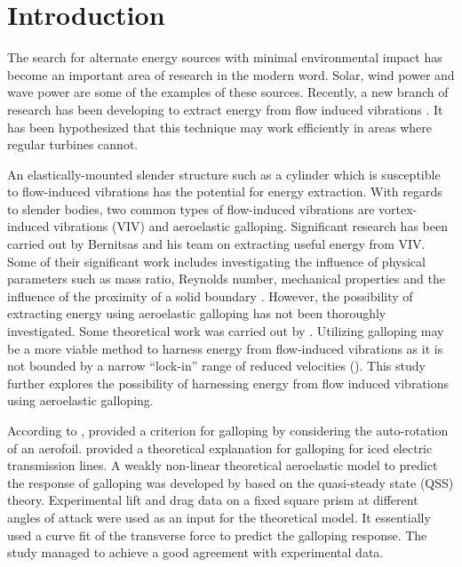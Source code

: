\section{Introduction} 

The search for alternate energy sources with minimal environmental impact has become an important area of research in the modern word. Solar, wind power and wave power are some of the examples of these sources.  Recently, a new branch of research has been developing to extract energy from flow induced vibrations \citep{Bernitsas2008a-concept}. It has been hypothesized that this technique may work efficiently in areas where regular turbines cannot. 

An elastically-mounted slender structure such as a cylinder which is susceptible to flow-induced vibrations has the potential for energy extraction. With regards to slender bodies, two common types of flow-induced vibrations are vortex-induced vibrations (VIV) and aeroelastic galloping. Significant research has been carried out by Bernitsas and his team on extracting useful energy from VIV. Some of their significant work includes investigating the influence  of physical parameters such as mass ratio, Reynolds number, mechanical properties \citep{Raghavan2010a, Lee2011b} and the influence of the proximity of a solid boundary \citep{Raghavan2009}. However, the possibility of extracting energy using aeroelastic galloping has not been thoroughly investigated. Some theoretical work was carried out by \citet{Barrero-Gil2010a}. Utilizing galloping may be a more viable method to harness energy from flow-induced vibrations as it is not bounded by a narrow ``lock-in'' range of reduced velocities (\ustar). This study further explores the possibility of harnessing energy from flow induced vibrations using aeroelastic galloping.

According to \citet{Paidoussis2010}, \citet{Glauert1919} provided a criterion for galloping by considering the auto-rotation of an aerofoil.  \citet{DenHartog1956} provided a theoretical explanation for galloping for iced electric transmission lines. A weakly non-linear theoretical aeroelastic model to predict the response of galloping was developed by \citet{Parkinson1964} based on the quasi-steady state (QSS) theory. Experimental lift and drag data on a fixed square prism at different angles of attack were used as an input for the theoretical model. It essentially used a curve fit of the transverse force to predict the galloping response. The study managed to achieve a good agreement with experimental data.

